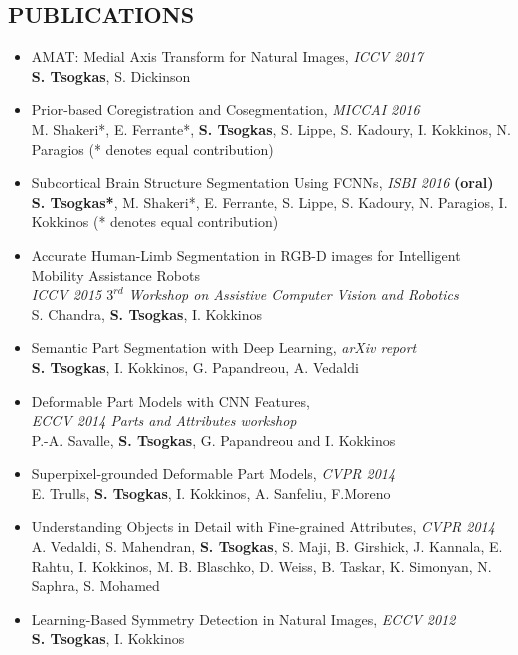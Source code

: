 \documentclass[margin]{res}
\begin{document}
\begin{resume}
\section{PUBLICATIONS} 
	\begin{itemize}
	\item   AMAT: Medial Axis Transform for Natural Images, \emph{ICCV 2017}\\
		  \textbf{S. Tsogkas}, S. Dickinson 
	\item  Prior-based Coregistration and Cosegmentation, \emph{MICCAI 2016}\\
		  M. Shakeri*, E. Ferrante*, \textbf{S. Tsogkas}, S. Lippe, S. Kadoury, I. Kokkinos,  N. Paragios (* denotes equal contribution)   
	\item  Subcortical Brain Structure Segmentation Using FCNNs, \emph{ISBI 2016} \textbf{(oral)}\\
		  \textbf{S. Tsogkas*}, M. Shakeri*, E. Ferrante, S. Lippe, S. Kadoury, N. Paragios, I. Kokkinos (* denotes equal contribution)   
	\item   Accurate Human-Limb Segmentation in RGB-D images for Intelligent Mobility Assistance Robots\\
		   \emph{ICCV 2015 $3^{rd}$ Workshop on Assistive Computer Vision and Robotics}\\
		  S. Chandra, \textbf{S. Tsogkas}, I. Kokkinos
	\item   Semantic Part Segmentation with Deep Learning, \emph{arXiv report}\\
		  \textbf{S. Tsogkas}, I. Kokkinos, G. Papandreou, A. Vedaldi 
	\item  Deformable Part Models with CNN Features,\\ \emph{ECCV 2014 Parts and Attributes workshop}\\
	  P.-A. Savalle, \textbf{S. Tsogkas}, G. Papandreou and I. Kokkinos 
	\item  Superpixel-grounded Deformable Part Models, \emph{CVPR 2014}\\
		  E. Trulls, \textbf{S. Tsogkas}, I. Kokkinos, A. Sanfeliu, F.Moreno
	\item Understanding Objects in Detail with Fine-grained Attributes, \emph{CVPR 2014} \\
	A. Vedaldi, S. Mahendran, \textbf{S. Tsogkas}, S. Maji, B. Girshick, J. Kannala, E. Rahtu, I. Kokkinos, M. B. Blaschko, D. Weiss, B. Taskar, K. Simonyan, N. Saphra, S. Mohamed 
	\item Learning-Based Symmetry Detection in Natural Images, \emph{ECCV 2012} \\
		  \textbf{S. Tsogkas}, I. Kokkinos
	\end{itemize}


\end{resume}
\end{document}
